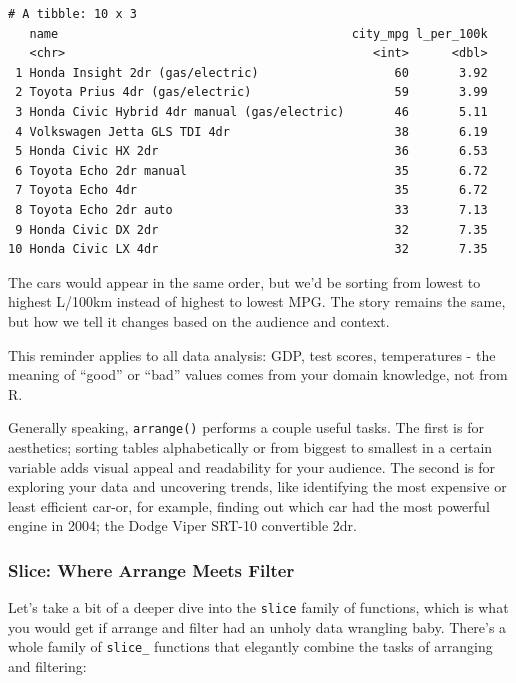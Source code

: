 \documentclass[
  letterpaper,
]{book}
\begin{document}
\begin{tcolorbox}
\begin{verbatim}
# A tibble: 10 x 3
   name                                         city_mpg l_per_100k
   <chr>                                           <int>      <dbl>
 1 Honda Insight 2dr (gas/electric)                   60       3.92
 2 Toyota Prius 4dr (gas/electric)                    59       3.99
 3 Honda Civic Hybrid 4dr manual (gas/electric)       46       5.11
 4 Volkswagen Jetta GLS TDI 4dr                       38       6.19
 5 Honda Civic HX 2dr                                 36       6.53
 6 Toyota Echo 2dr manual                             35       6.72
 7 Toyota Echo 4dr                                    35       6.72
 8 Toyota Echo 2dr auto                               33       7.13
 9 Honda Civic DX 2dr                                 32       7.35
10 Honda Civic LX 4dr                                 32       7.35
\end{verbatim}

The cars would appear in the same order, but we'd be sorting from lowest
to highest L/100km instead of highest to lowest MPG. The story remains
the same, but how we tell it changes based on the audience and context.

This reminder applies to all data analysis: GDP, test scores,
temperatures - the meaning of ``good'' or ``bad'' values comes from your
domain knowledge, not from R.

\end{tcolorbox}

Generally speaking, \texttt{arrange()} performs a couple useful tasks.
The first is for aesthetics; sorting tables alphabetically or from
biggest to smallest in a certain variable adds visual appeal and
readability for your audience. The second is for exploring your data and
uncovering trends, like identifying the most expensive or least
efficient car-or, for example, finding out which car had the most
powerful engine in 2004; the Dodge Viper SRT-10 convertible 2dr.

\subsubsection{Slice: Where Arrange Meets
Filter}\label{slice-where-arrange-meets-filter}

Let's take a bit of a deeper dive into the \texttt{slice} family of
functions, which is what you would get if arrange and filter had an
unholy data wrangling baby. There's a whole family of \texttt{slice\_}
functions that elegantly combine the tasks of arranging and filtering:
\end{document}
